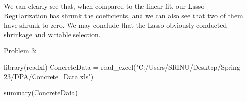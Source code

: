 \documentclass[
]{article}
\newenvironment{Shaded}{\begin{snugshade}}{\end{snugshade}}
\newcommand{\FunctionTok}[1]{\textcolor[rgb]{0.00,0.00,0.00}{#1}}
\newcommand{\NormalTok}[1]{#1}
\newcommand{\OtherTok}[1]{\textcolor[rgb]{0.56,0.35,0.01}{#1}}
\newcommand{\StringTok}[1]{\textcolor[rgb]{0.31,0.60,0.02}{#1}}
\begin{document}
We can clearly see that, when compared to the linear fit, our Lasso
Regularization has shrunk the coefficients, and we can also see that two
of them have shrunk to zero. We may conclude that the Lasso obviously
conducted shrinkage and variable selection.

Problem 3:

\begin{Shaded}
\begin{Highlighting}[]
\FunctionTok{library}\NormalTok{(readxl)}
\NormalTok{ConcreteData }\OtherTok{=} \FunctionTok{read\_excel}\NormalTok{(}\StringTok{"C:/Users/SRINU/Desktop/Spring 23/DPA/Concrete\_Data.xls"}\NormalTok{)}

\FunctionTok{summary}\NormalTok{(ConcreteData)}
\end{Highlighting}
\end{Shaded}
\end{document}
